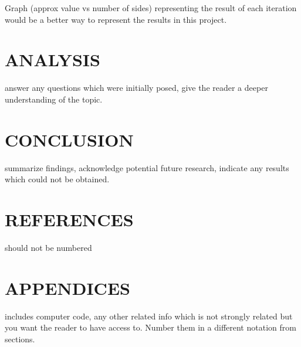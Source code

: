 \documentclass[12pt]{article}
\begin{document}
Graph (approx value vs number of sides) representing the result of each iteration would be a better way to represent the results in this project.


\section {ANALYSIS}
answer any questions which were initially posed, give the reader a deeper understanding of the topic.


\section {CONCLUSION}
summarize findings, acknowledge potential future research, indicate any results which could not be obtained.


\section {REFERENCES}
should not be numbered

\section {APPENDICES}
includes computer code, any other related info which is not strongly related but you want the reader to have access to. Number them in a different notation from sections.
\end{document}
